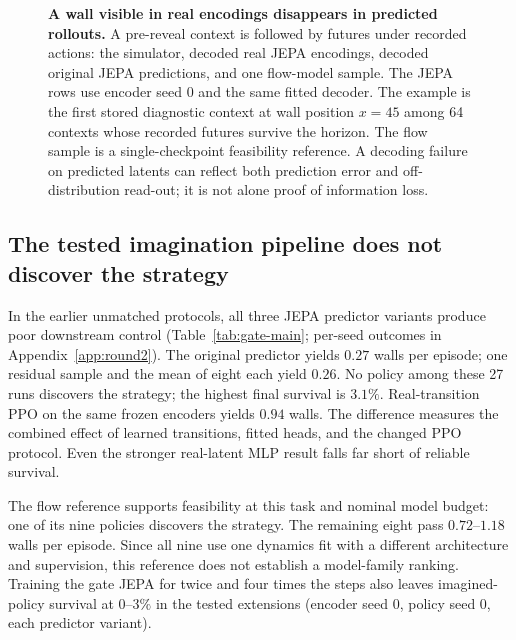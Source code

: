 \begin{figure}[t]
\centering
{}
\caption{\textbf{A wall visible in real encodings disappears in predicted rollouts.} A pre-reveal
context is followed by futures under recorded actions: the simulator, decoded real JEPA encodings,
decoded original JEPA predictions, and one flow-model sample. The JEPA rows use encoder seed 0
and the same fitted decoder. The example is the first stored diagnostic context at wall position
$x=45$ among 64 contexts whose recorded futures survive the horizon. The flow sample is a single-checkpoint feasibility reference.
A decoding failure on predicted latents can reflect both prediction error and off-distribution
read-out; it is not alone proof of information loss.}
\label{fig:rollouts}
\end{figure}

\subsection{The tested imagination pipeline does not discover the strategy}
\label{app:results-ppo}
\label{app:results}

In the earlier unmatched protocols, all three JEPA predictor variants produce poor downstream control
(Table~\ref{tab:gate-main}; per-seed outcomes in Appendix~\ref{app:round2}). The original predictor yields $0.27$ walls
per episode; one residual sample and the mean of eight each yield $0.26$. No policy among these
27 runs discovers the strategy; the highest final survival is $3.1\%$. Real-transition PPO on the
same frozen encoders yields $0.94$ walls. The difference measures the combined effect of learned
transitions, fitted heads, and the changed PPO protocol. Even the stronger real-latent MLP result
falls far short of reliable survival.

The flow reference supports feasibility at this task and nominal model budget: one of its nine
policies discovers the strategy. The remaining eight pass $0.72$--$1.18$ walls per episode. Since
all nine use one dynamics fit with a different architecture and supervision, this reference does
not establish a model-family ranking. Training the gate JEPA for twice and four times the steps
also leaves imagined-policy survival at $0$--$3\%$ in the tested extensions (encoder seed 0, policy
seed 0, each predictor variant).

\begin{table}[t]
\centering
\caption{\textbf{Final gate outcomes, with predictor variants kept separate.} Mean $\pm$ sample
standard deviation across policy runs; discovery is final survival above $50\%$. JEPA imagination variants and real-latent
conditions each contain $3$ models $\times$ $3$ policies; pixel controls have three policies. Real training changes rewards, terminations, and PPO protocol
alongside dynamics. Flow is a single-model reference.}
\label{tab:gate-main}
\end{table}



